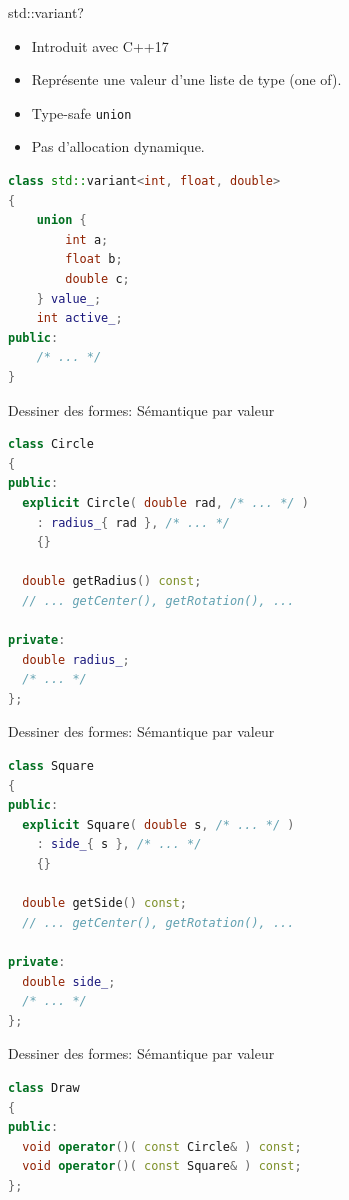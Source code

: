 \documentclass[french]{beamer}
\begin{document}
\begin{frame}[fragile]{std::variant?}
    \begin{itemize}
        \item Introduit avec C++17
        \item Représente une valeur d'une liste de type (one of).
        \item Type-safe \lstinline{union}
        \item Pas d'allocation dynamique.
    \end{itemize}
    \begin{lstlisting}[language=C++]
class std::variant<int, float, double>
{
    union {
        int a;
        float b;
        double c;
    } value_;
    int active_;
public:
    /* ... */
}
    \end{lstlisting}
\end{frame}

\begin{frame}[fragile]{Dessiner des formes: Sémantique par valeur}
    \begin{lstlisting}[language=C++]
class Circle
{
public:
  explicit Circle( double rad, /* ... */ )
    : radius_{ rad }, /* ... */
    {}
 
  double getRadius() const;
  // ... getCenter(), getRotation(), ...
 
private:
  double radius_;
  /* ... */
};
    \end{lstlisting}
\end{frame}

\begin{frame}[fragile]{Dessiner des formes: Sémantique par valeur}
    \begin{lstlisting}[language=C++]
class Square
{
public:
  explicit Square( double s, /* ... */ )
    : side_{ s }, /* ... */
    {}
 
  double getSide() const;
  // ... getCenter(), getRotation(), ...
 
private:
  double side_;
  /* ... */
};
    \end{lstlisting}
\end{frame}

\begin{frame}[fragile]{Dessiner des formes: Sémantique par valeur}
    \begin{lstlisting}[language=C++]
class Draw
{
public:
  void operator()( const Circle& ) const;
  void operator()( const Square& ) const;
};
    \end{lstlisting}
\end{frame}
\end{document}
